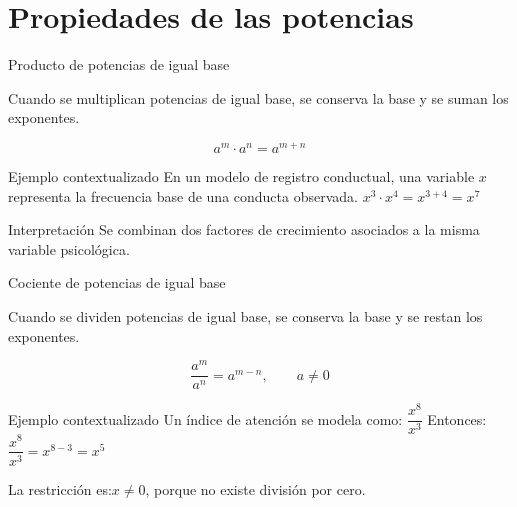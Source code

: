 \documentclass[aspectratio=169]{beamer}
\begin{document}
	\section{Propiedades de las potencias}
	
	\begin{frame}{Producto de potencias de igual base}
		\begin{idea}
			Cuando se multiplican potencias de igual base, se conserva la base y se suman los exponentes.
		\end{idea}
		
		\[
		a^m\cdot a^n=a^{m+n}
		\]
		
		\pause
		
		\begin{exampleblock}{Ejemplo contextualizado}
			En un modelo de registro conductual, una variable \(x\) representa la frecuencia base de una conducta observada. 
			$x^3\cdot x^4=x^{3+4}=x^7$			
		\end{exampleblock}
		
		\pause
		
		\begin{block}{Interpretación}
			Se combinan dos factores de crecimiento asociados a la misma variable psicológica.
		\end{block}
	\end{frame}
	
	
	\begin{frame}{Cociente de potencias de igual base}
		\begin{idea}
			Cuando se dividen potencias de igual base, se conserva la base y se restan los exponentes.
		\end{idea}		
		\[
		\frac{a^m}{a^n}=a^{m-n},
		\qquad a\neq 0
		\]
		
		\pause
		
		\begin{exampleblock}{Ejemplo contextualizado}
			Un índice de atención se modela como: $\dfrac{x^8}{x^3}$
			Entonces: $\dfrac{x^8}{x^3}=x^{8-3}=x^5$
		\end{exampleblock}
		
		\pause
		
		\begin{alerta}
			La restricción es:$x\neq 0$, porque no existe división por cero.
		\end{alerta}
	\end{frame}
	
\end{document}
